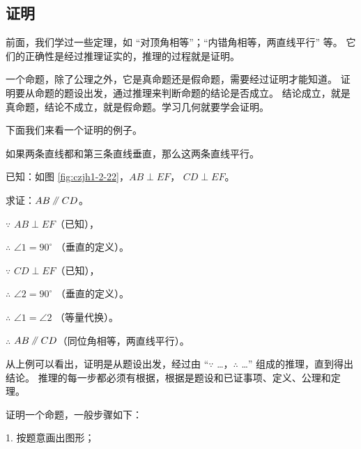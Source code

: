 \subsection{证明}\label{subsec:czjh1-2-9}

前面，我们学过一些定理，如 “对顶角相等”；“内错角相等，两直线平行” 等。
它们的正确性是经过推理证实的，推理的过程就是证明。

一个命题，除了公理之外，它是真命题还是假命题，需要经过证明才能知道。
证明要从命题的题设出发，通过推理来判断命题的结论是否成立。
结论成立，就是真命题，结论不成立，就是假命题。学习几何就要学会证明。

下面我们来看一个证明的例子。

\begin{dingli}[定理]
    如果两条直线都和第三条直线垂直，那么这两条直线平行。
\end{dingli}

已知：如图 \ref{fig:czjh1-2-22}，$AB \perp EF$， $CD \perp EF$。

求证：$AB \pingxing CD$。

\zhengming $\because$ \quad $AB \perp EF$（已知），

$\therefore$ \quad $\angle 1 = 90^\circ$ （垂直的定义）。

$\because$ \quad $CD \perp EF$（已知），

$\therefore$ \quad $\angle 2 = 90^\circ$ （垂直的定义）。

$\therefore$ \quad $\angle 1 = \angle 2$ （等量代换）。

$\therefore$ \quad $AB \pingxing CD$（同位角相等，两直线平行）。

\begin{figure}[htbp]
    \centering
    \begin{minipage}[b]{7cm}
        \centering
        
        \caption{}\label{fig:czjh1-2-22}
    \end{minipage}
    \qquad
    \begin{minipage}[b]{7cm}
        \centering
        
        \caption{}\label{fig:czjh1-2-23}
    \end{minipage}
\end{figure}


从上例可以看出，证明是从题设出发，经过由 “$\because$ …，$\therefore$ …” 组成的推理，直到得出结论。
推理的每一步都必须有根据，根据是题设和已证事项、定义、公理和定理。

证明一个命题，一般步骤如下：

1. 按题意画出图形；

